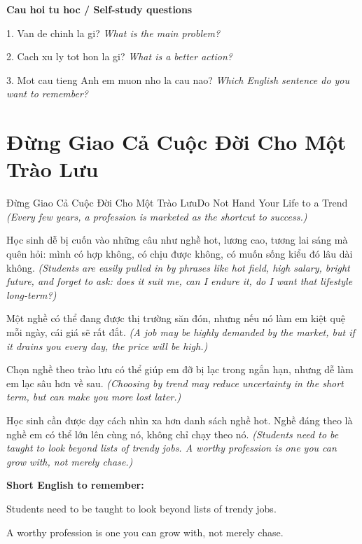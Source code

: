 \begin{tuhocnhanh}
\textbf{Cau hoi tu hoc / Self-study questions}

1. Van de chinh la gi? \textit{What is the main problem?}

2. Cach xu ly tot hon la gi? \textit{What is a better action?}

3. Mot cau tieng Anh em muon nho la cau nao? \textit{Which English sentence do you want to remember?}
\end{tuhocnhanh}
\ngancach

\section{Đừng Giao Cả Cuộc Đời Cho Một Trào Lưu}
\begin{truyen}{Đừng Giao Cả Cuộc Đời Cho Một Trào Lưu}{Do Not Hand Your Life to a Trend}
\textit{(Every few years, a profession is marketed as the shortcut to success.)}

Học sinh dễ bị cuốn vào những câu như nghề hot, lương cao, tương lai sáng mà quên hỏi: mình có hợp không, có chịu được không, có muốn sống kiểu đó lâu dài không.
\textit{(Students are easily pulled in by phrases like hot field, high salary, bright future, and forget to ask: does it suit me, can I endure it, do I want that lifestyle long-term?)}

Một nghề có thể đang được thị trường săn đón, nhưng nếu nó làm em kiệt quệ mỗi ngày, cái giá sẽ rất đắt.
\textit{(A job may be highly demanded by the market, but if it drains you every day, the price will be high.)}

Chọn nghề theo trào lưu có thể giúp em đỡ bị lạc trong ngắn hạn, nhưng dễ làm em lạc sâu hơn về sau.
\textit{(Choosing by trend may reduce uncertainty in the short term, but can make you more lost later.)}

\end{truyen}

\begin{baihoc}
Học sinh cần được dạy cách nhìn xa hơn danh sách nghề hot. Nghề đáng theo là nghề em có thể lớn lên cùng nó, không chỉ chạy theo nó.
\textit{(Students need to be taught to look beyond lists of trendy jobs. A worthy profession is one you can grow with, not merely chase.)}
\end{baihoc}

\begin{ghinhoanh}
\textbf{Short English to remember:}

Students need to be taught to look beyond lists of trendy jobs.

A worthy profession is one you can grow with, not merely chase.

\end{ghinhoanh}

